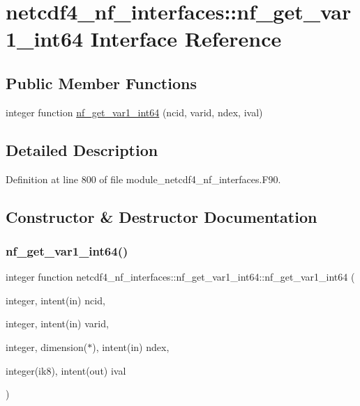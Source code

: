\hypertarget{interfacenetcdf4__nf__interfaces_1_1nf__get__var1__int64}{}\section{netcdf4\+\_\+nf\+\_\+interfaces\+:\+:nf\+\_\+get\+\_\+var1\+\_\+int64 Interface Reference}
\label{interfacenetcdf4__nf__interfaces_1_1nf__get__var1__int64}
\subsection*{Public Member Functions}
\begin{DoxyCompactItemize}
\item 
integer function \hyperlink{interfacenetcdf4__nf__interfaces_1_1nf__get__var1__int64_a80e3908bede617a4d12b92587c94466b}{nf\+\_\+get\+\_\+var1\+\_\+int64} (ncid, varid, ndex, ival)
\end{DoxyCompactItemize}


\subsection{Detailed Description}


Definition at line 800 of file module\+\_\+netcdf4\+\_\+nf\+\_\+interfaces.\+F90.



\subsection{Constructor \& Destructor Documentation}
\mbox{\label{interfacenetcdf4__nf__interfaces_1_1nf__get__var1__int64_a80e3908bede617a4d12b92587c94466b}} 
\subsubsection{\texorpdfstring{nf\+\_\+get\+\_\+var1\+\_\+int64()}{nf\_get\_var1\_int64()}}
{\footnotesize\ttfamily integer function netcdf4\+\_\+nf\+\_\+interfaces\+::nf\+\_\+get\+\_\+var1\+\_\+int64\+::nf\+\_\+get\+\_\+var1\+\_\+int64 (\begin{DoxyParamCaption}\item[{integer, intent(in)}]{ncid,  }\item[{integer, intent(in)}]{varid,  }\item[{integer, dimension($\ast$), intent(in)}]{ndex,  }\item[{integer(ik8), intent(out)}]{ival }\end{DoxyParamCaption})}




